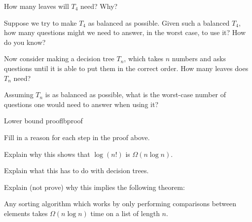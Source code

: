 \documentclass{tufte-handout}
\begin{document}
\begin{questions}
  \item How many leaves will $T_4$ need? Why?
  \item Suppose we try to make $T_4$ as balanced as possible.  Given
    such a balanced $T_4$, how many questions might we need to answer,
    in the worst case, to use it?  How do you know?
  \item Now consider making a decision tree $T_n$, which takes $n$
    numbers and asks questions until it is able to put them in the
    correct order.  How many leaves does $T_n$ need?
  \item Assuming $T_n$ is as balanced as possible, what is the
    worst-case number of questions one would need to answer when using
    it? \label{q:tn}
  \end{questions}
\pause
\begin{model*}{Lower bound proof}{lbproof}
  \begin{sproof}
  \end{sproof}
\end{model*}
\begin{questions}
\item Fill in a reason for each step in the proof above.
  \begin{subquestions}
  \item \mbox{}
  \item \mbox{}
  \item \mbox{}
  \item \mbox{}
  \item \mbox{}
  \end{subquestions}
\item Explain why this shows that $\log(n!)$ is $\Omega(n \log n)$.
\newpage
\item Explain what this has to do with decision trees.
\item Explain (not prove) why this implies the following theorem:
\end{questions}
\begin{thm} \label{thm:compsort}
  Any sorting algorithm which works by only performing comparisons
  between elements takes $\Omega(n \log n)$ time on a list of length
  $n$.
\end{thm}
\pause
\end{document}

